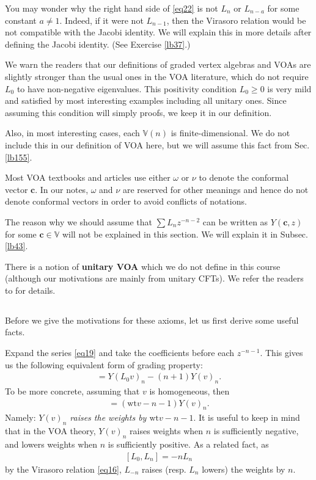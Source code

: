 \documentclass[12pt,a4paper,notitlepage]{article}
\theoremstyle{definition}
\theoremstyle{plain}
\newcommand{\Vbb}{\mathbb V}
\newcommand{\cbf}{\mathbf c}
\newcommand{\wt}{\mathrm{wt}}
\numberwithin{equation}{section}
\begin{document}
You may wonder why the right hand side of \eqref{eq22} is not $L_n$ or $L_{n-a}$ for some constant $a\neq 1$. Indeed, if it were not $L_{n-1}$, then the Virasoro relation would be not compatible with the Jacobi identity. We will explain this in more details after defining the Jacobi identity. (See Exercise \ref{lb37}.)



We warn the readers that our definitions of graded vertex algebras and VOAs are slightly stronger than the usual ones in the VOA literature, which do not require  $L_0$ to have non-negative eigenvalues. This positivity condition $L_0\geq 0$ is very mild and satisfied by most interesting examples including all unitary ones. Since assuming this condition will simply proofs, we keep it in our definition.

Also, in most interesting cases, each $\Vbb(n)$ is finite-dimensional. We do not include this in our definition of VOA here, but we will assume this fact from Sec. \ref{lb155}.

Most VOA textbooks and articles use either $\omega$ or $\nu$ to denote the conformal vector $\cbf$. In our notes, $\omega$ and $\nu$ are reserved for other meanings and hence do not denote conformal vectors in order to avoid conflicts of notations. 

The reason why we should assume that $\sum L_nz^{-n-2}$ can be written as $Y(\cbf,z)$ for some $\cbf\in\Vbb$ will not be explained in this section. We will explain it in Subsec. \ref{lb43}.

There is a notion of \textbf{unitary VOA} which we do not define in this course (although our motivations are mainly from unitary CFTs). We refer the readers to \cite{CKLW18,DL14} for details.


\subsection{}

Before we give the motivations for these axioms, let us first derive some useful facts.

Expand the series \eqref{eq19} and take the coefficients before each $z^{-n-1}$. This gives us  the following equivalent form of grading property:
\begin{align}
[L_0,Y(v)_n]=Y(L_0v)_n-(n+1)Y(v)_n.	\label{eq20}
\end{align}
To be more concrete, assuming that $v$ is homogeneous, then
\begin{align}
[L_0,Y(v)_n]=(\wt v-n-1)Y(v)_n.	\label{eq21}
\end{align}
Namely: \emph{$Y(v)_n$ raises the weights by $\wt v-n-1$}. It is useful to keep in mind that in the VOA theory, $Y(v)_n$ raises weights when $n$ is sufficiently negative, and lowers weights when $n$ is sufficiently positive. As a related fact, as
\begin{align}\label{eq57}
[L_0,L_n]=-nL_n	
\end{align}
by the Virasoro relation \eqref{eq16}, $L_{-n}$ raises (resp. $L_n$ lowers) the weights by $n$. 
\end{document}
